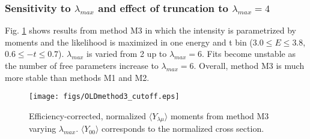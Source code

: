 \documentclass[twocolumn,superscriptaddress,prd]{revtex4}
\begin{document}
\subsubsection{Sensitivity to $\lambda_{max}$ and effect of truncation to $\lambda_{max}=4$}
Fig. \ref{fig:cutoff3} shows results from method M3 in which the intensity is parametrized by moments and the likelihood is maximized in one energy and t bin ($3.0\le E \le 3.8$, $0.6 \le -t \le 0.7$). $\lambda_{max}$ is varied from 2 up to $\lambda_{max} = 6$. Fits become unstable as the number of free parameters increase to $\lambda_{max}=6$. Overall, method M3 is much more stable than methods M1 and M2. 
\begin{figure}
\texttt{[image: figs/OLDmethod3\_cutoff.eps]}
\caption{Efficiency-corrected, normalized $\langle {Y}_{\lambda \mu}\rangle$ moments from method M3 varying $\lambda_{max}$. $\langle {Y}_{00}\rangle$ corresponds to the normalized cross section.}
\label{fig:cutoff3}
\end{figure}
\end{document}
